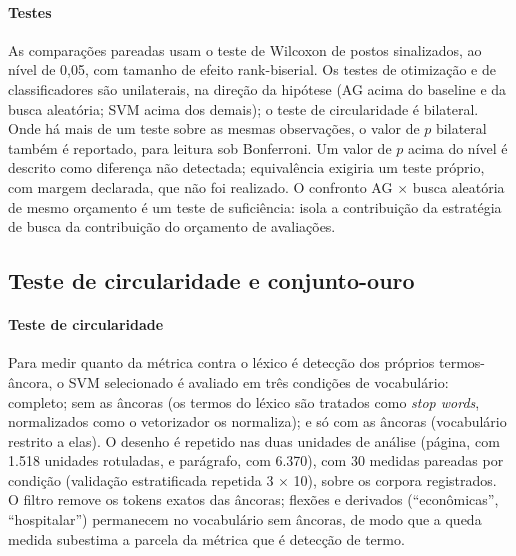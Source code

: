 \documentclass[fleqn,10pt]{SelfArx}
\begin{document}
\paragraph{Testes} As comparações pareadas usam o teste de Wilcoxon de postos sinalizados, ao nível de 0,05, com tamanho de efeito rank-biserial. Os testes de otimização e de classificadores são unilaterais, na direção da hipótese (AG acima do baseline e da busca aleatória; SVM acima dos demais); o teste de circularidade é bilateral. Onde há mais de um teste sobre as mesmas observações, o valor de $p$ bilateral também é reportado, para leitura sob Bonferroni. Um valor de $p$ acima do nível é descrito como diferença não detectada; equivalência exigiria um teste próprio, com margem declarada, que não foi realizado. O confronto AG $\times$ busca aleatória de mesmo orçamento é um teste de suficiência: isola a contribuição da estratégia de busca da contribuição do orçamento de avaliações.

\subsection{Teste de circularidade e conjunto-ouro}
\label{sec:circ}

\paragraph{Teste de circularidade} Para medir quanto da métrica contra o léxico é detecção dos próprios termos-âncora, o SVM selecionado é avaliado em três condições de vocabulário: completo; sem as âncoras (os termos do léxico são tratados como \emph{stop words}, normalizados como o vetorizador os normaliza); e só com as âncoras (vocabulário restrito a elas). O desenho é repetido nas duas unidades de análise (página, com 1.518 unidades rotuladas, e parágrafo, com 6.370), com 30 medidas pareadas por condição (validação estratificada repetida 3 $\times$ 10), sobre os corpora registrados. O filtro remove os tokens exatos das âncoras; flexões e derivados (``econômicas'', ``hospitalar'') permanecem no vocabulário sem âncoras, de modo que a queda medida subestima a parcela da métrica que é detecção de termo.
\end{document}
